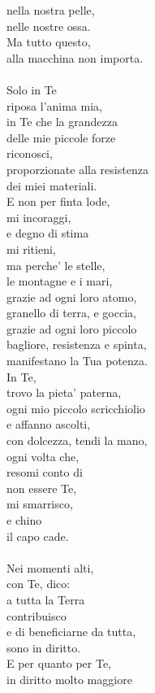 \begin{haiku}
nella nostra pelle,\\
nelle nostre ossa.\\
Ma tutto questo,\\
alla macchina non importa.\\
\leavevmode\\
Solo in Te\\
riposa l'anima mia,\\
in Te che la grandezza\\
delle mie piccole forze\\
riconosci,\\
proporzionate alla resistenza\\
dei miei materiali.\\
E non per finta lode,\\
mi incoraggi,\\
e degno di stima\\
mi ritieni,\\
ma perche' le stelle, \\
le montagne e i mari,\\
grazie ad ogni loro atomo,\\
granello di terra, e goccia,\\
grazie ad ogni loro piccolo\\
bagliore, resistenza e spinta,\\
manifestano la Tua potenza.\\
In Te,\\
trovo la pieta' paterna,\\
ogni mio piccolo scricchiolio\\
e affanno ascolti,\\
con dolcezza, tendi la mano,\\
ogni volta che,\\
resomi conto di \\
non essere Te,\\
mi smarrisco,\\
e chino\\
il capo cade.\\
\leavevmode\\
Nei momenti alti,\\
con Te, dico:\\
a tutta la Terra\\
contribuisco\\
e di beneficiarne da tutta,\\
sono in diritto.\\
E per quanto per Te,\\
in diritto molto maggiore\\

\end{haiku}
